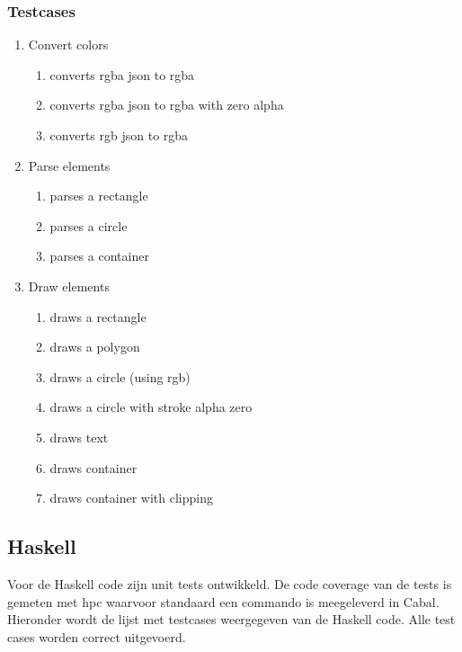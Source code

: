 \subsubsection{Testcases}
\begin{enumerate}[label={T\arabic*}]
	\item Convert colors
	\begin{enumerate}[label={T\arabic{enumi}.\arabic*}]
		\item \label{test:js:convert:rgbajson:rgba} converts rgba json to rgba
		\item \label{test:js:convert:rgbajson:rgba:alphazero} converts rgba json to rgba with zero alpha
		\item \label{test:js:convert:rgbjson:rgba} converts rgb json to rgba
	\end{enumerate}
	\item Parse elements
	\begin{enumerate}[label={T\arabic{enumi}.\arabic*}]
		\item \label{test:js:parse:rect} parses a rectangle
		\item \label{test:js:parse:circle} parses a circle
		\item \label{test:js:parse:container} parses a container
	\end{enumerate}
	\item Draw elements
	\begin{enumerate}[label={T\arabic{enumi}.\arabic*}]
		\item \label{test:js:draw:rect} draws a rectangle
		\item \label{test:js:draw:polygon} draws a polygon
		\item \label{test:js:draw:circle} draws a circle (using rgb)
		\item \label{test:js:draw:circle:alpha} draws a circle with stroke alpha zero
		\item \label{test:js:draw:text} draws text
		\item \label{test:js:draw:container} draws container
		\item \label{test:js:draw:container:clipping} draws container with clipping
	\end{enumerate}
	\setcounter{startvaluetest}{\value{enumi}}
\end{enumerate}

\subsection{Haskell}
Voor de Haskell code zijn unit tests ontwikkeld. De code coverage van de tests is gemeten met hpc waarvoor standaard een commando is meegeleverd in Cabal. Hieronder wordt de lijst met testcases weergegeven van de Haskell code. Alle test cases worden correct uitgevoerd.


